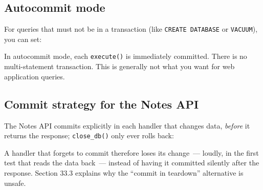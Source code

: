 \subsection*{Autocommit mode}\label{33-logic-execution:autocommit-mode}

For queries that must not be in a transaction (like \texttt{CREATE\ DATABASE} or \texttt{VACUUM}), you can set:

\begin{codebox}[short]

\begin{Shaded}
\begin{Highlighting}[]
\OperatorTok{=} 
\end{Highlighting}
\end{Shaded}

\end{codebox}

\noindent{}In autocommit mode, each \texttt{execute()} is immediately committed. There is no multi-statement transaction. This is generally not what you want for web application queries.

\subsection*{Commit strategy for the Notes API}\label{33-logic-execution:commit-strategy-for-the-notes-api}

The Notes API commits explicitly in each handler that changes data, \emph{before} it returns the response; \texttt{close\_db()} only ever rolls back:

\begin{codebox}[short]

\begin{Shaded}
\begin{Highlighting}[]

\end{Highlighting}
\end{Shaded}

\end{codebox}

\noindent{}A handler that forgets to commit therefore loses its change~--- loudly, in the first test that reads the data back~--- instead of having it committed silently after the response. Section 33.3 explains why the ``commit in teardown'' alternative is unsafe.

